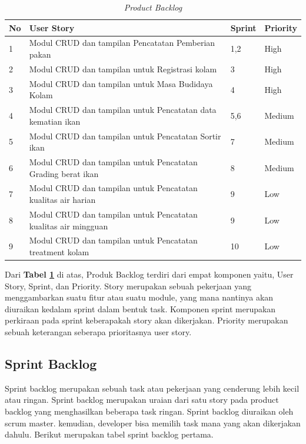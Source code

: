 \begin{table}[H]
	\centering
	\caption{\textit{Product Backlog}}
	\label{table:product_backlog}
	\begin{tabular}{@{} |p{0.5cm}|p{10cm}|p{1cm}|p{2cm}| @{}}
		\hline
		\textbf{No} & \textbf{User Story} & \textbf{Sprint} & \textbf{Priority}\\
		\hline
		1 & Modul CRUD dan tampilan Pencatatan Pemberian pakan &  1,2 & High\\
		\hline
		2 & Modul CRUD dan tampilan untuk Registrasi kolam&  3 & High\\
		\hline
		3 & Modul CRUD dan tampilan untuk Masa Budidaya Kolam &  4 & High\\
		\hline
		4 & Modul CRUD dan tampilan untuk Pencatatan data kematian ikan &  5,6 & Medium\\
		\hline
		5 & Modul CRUD dan tampilan untuk Pencatatan Sortir ikan &  7 & Medium\\
		\hline
		6 & Modul CRUD dan tampilan untuk Pencatatan Grading berat ikan &  8 & Medium\\
		\hline
		7 & Modul CRUD dan tampilan untuk Pencatatan kualitas air harian &  9 & Low\\
		\hline
		8 & Modul CRUD dan tampilan untuk Pencatatan kualitas air mingguan &  9 & Low\\
		\hline
		9 & Modul CRUD dan tampilan untuk Pencatatan treatment kolam &  10 & Low\\
		\hline
	\end{tabular}
\end{table}
	
	Dari \textbf{Tabel \ref{table:product_backlog}} di atas, Produk Backlog terdiri dari empat komponen yaitu, User Story, Sprint, dan Priority. Story merupakan sebuah pekerjaan yang menggambarkan suatu fitur atau suatu module, yang mana nantinya akan diuraikan kedalam sprint dalam bentuk task. Komponen sprint merupakan perkiraan pada sprint keberapakah story akan dikerjakan. Priority merupakan sebuah keterangan seberapa prioritasnya user story.
	
	\subsection{Sprint Backlog}
	
	Sprint backlog merupakan sebuah task atau pekerjaan yang cenderung lebih kecil atau ringan. Sprint backlog merupakan uraian dari satu story pada product backlog yang menghasilkan beberapa task ringan. Sprint backlog diuraikan oleh scrum master. kemudian, developer bisa memilih task mana yang akan dikerjakan dahulu. Berikut merupakan tabel sprint backlog pertama.
	
